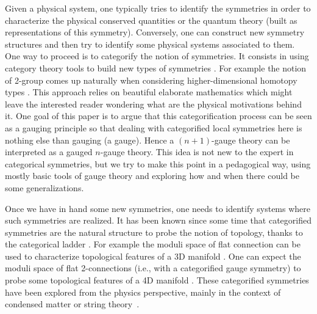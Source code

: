 \documentclass[onecolumn]{article}
\theoremstyle{theorem}
\theoremstyle{remark}
\theoremstyle{example}
\theoremstyle{definition}
\numberwithin{equation}{section}
\begin{document}

Given a physical system, one typically tries to identify the symmetries in order to characterize the physical conserved quantities or the quantum theory (built as representations of this symmetry). Conversely, one can   construct new symmetry structures and then try to identify some physical systems associated to them. One way to proceed is to {{categorify}} the notion of symmetries. It consists in using category theory tools to build new types of symmetries \cite{Baez:2003fs}. For example the notion of 2-group comes up naturally when considering higher-dimensional homotopy types \cite{Brown,Ang2018}. This approach relies on beautiful elaborate mathematics which might leave the interested reader wondering what are the physical motivations behind it. One goal of this paper is to argue that this categorification process can be seen as a gauging principle so that dealing with categorified local symmetries here is nothing else than gauging (a gauge). Hence a $(n+1)$-gauge theory can be interpreted as a gauged $n$-gauge theory. This idea is  not new to the expert in categorical symmetries, but we try to make this point in a pedagogical way, using mostly basic tools of gauge theory and exploring how and when there could be some generalizations.    


Once we have in hand some new symmetries, one needs to identify systems where such symmetries are realized. It has been known since some time that categorified symmetries are the natural structure to probe the notion of topology, thanks to the categorical ladder \cite{Crane:1994fw,Mackaay:ek}. For example the moduli space of flat connection can be used to characterize topological features of a 3D manifold \cite{Fock:1998nu, Fock:1998nu}. One can expect the moduli space of flat 2-connections (i.e., with a categorified gauge symmetry) to probe some topological features of a 4D manifold \cite{Alvarez:2021, Cui_2017, Douglas:2018}. These categorified symmetries have been explored from the physics perspective, mainly in the context of condensed matter \cite{Kapustin:2013uxa,Zhu:2019,Kong:2020} or string theory~\cite{Carey:2005,Sati:2009ic}. 

\end{document}
